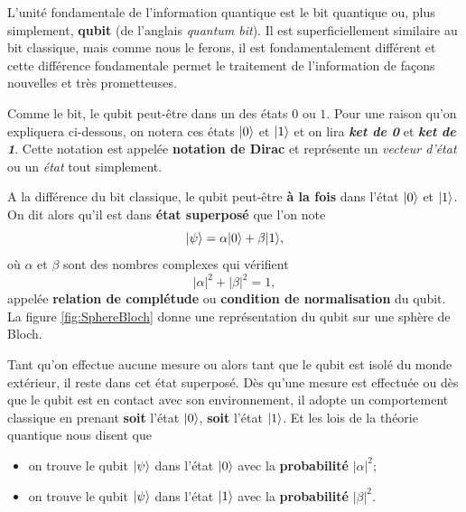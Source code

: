 L'unité fondamentale de l'information quantique est le bit quantique ou, plus
simplement, \textbf{qubit} (de l'anglais \emph{quantum bit}). Il est
superficiellement similaire au bit classique, mais comme nous le ferons, il est
fondamentalement différent et cette différence fondamentale permet le
traitement de l'information de façons nouvelles et très prometteuses.

Comme le bit, le qubit peut-être dans un des états $0$ ou $1$. Pour une raison
qu'on expliquera ci-dessous, on notera ces états $\vert0\rangle$ et $\vert1\rangle$ et on
lira \textbf{\emph{ket de 0}} et \textbf{\emph{ket de 1}}. Cette notation est
appelée \textbf{notation de Dirac} et représente un \emph{vecteur d'état} ou
un \emph{état} tout simplement.

A la différence du bit classique, le qubit peut-être \textbf{à la fois} dans
l'état $\vert0\rangle$ et  $\vert1\rangle$. On dit alors qu'il est dans \textbf{état
superposé} que l'on note
\begin{equation}
\vert\psi\rangle=\alpha\vert0\rangle+\beta\vert1\rangle,
\end{equation}
où $\alpha$ et $\beta$ sont des nombres complexes qui vérifient
\begin{equation}
 |\alpha|^{2}+|\beta|^{2}=1,
\end{equation}
appelée \textbf{relation de complétude} ou \textbf{condition de normalisation}
du qubit. La figure \ref{fig:SphereBloch} donne une représentation du qubit sur
une sphère de Bloch.

Tant qu'on effectue aucune mesure ou alors tant que le qubit est isolé du monde
extérieur, il reste dans cet état superposé. Dès qu'une mesure est effectuée
ou dès que le qubit est en contact avec son environnement, il adopte un
comportement classique en prenant \textbf{soit} l'état $\vert0\rangle$, \textbf{soit}
l'état $\vert1\rangle$. Et les lois de la théorie quantique nous disent que

\colorbox[gray]{0.8}{
\parbox[c]{0.9\textwidth}{
\begin{itemize}
\item on trouve le qubit $\vert\psi\rangle$ dans l'état $\vert0\rangle$ avec la
\textbf{probabilité} $|\alpha|^{2}$;
\item on trouve le qubit $\vert\psi\rangle$ dans l'état $\vert1\rangle$ avec la
\textbf{probabilité} $|\beta|^{2}$.
\end{itemize}
}}

